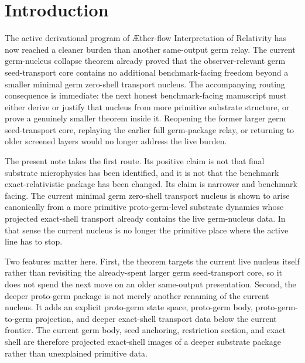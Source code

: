 \documentclass[11pt]{article}
\newcommand{\Aflow}{\AE{}ther-flow}
\newcommand{\TheoryName}{\Aflow{} Interpretation of Relativity}
\begin{document}
\section{Introduction}

The active derivational program of \TheoryName{} has now reached a cleaner burden than another same-output germ relay. The current germ-nucleus collapse theorem already proved that the observer-relevant germ seed-transport core contains no additional benchmark-facing freedom beyond a smaller minimal germ zero-shell transport nucleus. The accompanying routing consequence is immediate: the next honest benchmark-facing manuscript must either derive or justify that nucleus from more primitive substrate structure, or prove a genuinely smaller theorem inside it. Reopening the former larger germ seed-transport core, replaying the earlier full germ-package relay, or returning to older screened layers would no longer address the live burden.

The present note takes the first route. Its positive claim is not that final substrate microphysics has been identified, and it is not that the benchmark exact-relativistic package has been changed. Its claim is narrower and benchmark facing. The current minimal germ zero-shell transport nucleus is shown to arise canonically from a more primitive proto-germ-level substrate dynamics whose projected exact-shell transport already contains the live germ-nucleus data. In that sense the current nucleus is no longer the primitive place where the active line has to stop.

Two features matter here. First, the theorem targets the current live nucleus itself rather than revisiting the already-spent larger germ seed-transport core, so it does not spend the next move on an older same-output presentation. Second, the deeper proto-germ package is not merely another renaming of the current nucleus. It adds an explicit proto-germ state space, proto-germ body, proto-germ-to-germ projection, and deeper exact-shell transport data below the current frontier. The current germ body, seed anchoring, restriction section, and exact shell are therefore projected exact-shell images of a deeper substrate package rather than unexplained primitive data.
\end{document}
